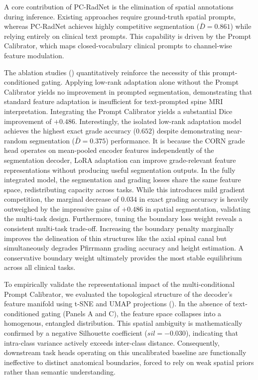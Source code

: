 \documentclass[journal]{IEEEtran}
\newcommand{\modelname}{PC-RadNet}
\begin{document}
A core contribution of \modelname{} is the elimination of spatial annotations during inference. Existing approaches require ground-truth spatial prompts, whereas \modelname{} achieves highly competitive segmentation ($\bar{D}=0.861$) while relying entirely on clinical text prompts. This capability is driven by the Prompt Calibrator, which maps closed-vocabulary clinical prompts to channel-wise feature modulation.  

The ablation studies () quantitatively reinforce the necessity of this prompt-conditioned gating. Applying low-rank adaptation alone without the Prompt Calibrator yields no improvement in prompted segmentation, demonstrating that standard feature adaptation is insufficient for text-prompted spine MRI interpretation. Integrating the Prompt Calibrator yields a substantial Dice improvement of $+0.486$. Interestingly, the isolated low-rank adaptation model achieves the highest exact grade accuracy ($0.652$) despite demonstrating near-random segmentation ($\bar{D}=0.375$) performance. It is because the CORN grade head operates on mean-pooled encoder features independently of the segmentation decoder, LoRA adaptation can improve grade-relevant feature representations without producing useful segmentation outputs. In the fully integrated model, the segmentation and grading losses share the same feature space, redistributing capacity across tasks. While this introduces mild gradient competition, the marginal decrease of $0.034$ in exact grading accuracy is heavily outweighed by the impressive gains of $+0.486$ in spatial segmentation, validating the multi-task design. Furthermore, tuning the boundary loss weight reveals a consistent multi-task trade-off. Increasing the boundary penalty marginally improves the delineation of thin structures like the axial spinal canal but simultaneously degrades Pfirrmann grading accuracy and height estimation. A conservative boundary weight ultimately provides the most stable equilibrium across all clinical tasks.

To empirically validate the representational impact of the multi-conditional Prompt Calibrator, we evaluated the topological structure of the decoder's feature manifold using t-SNE \cite{vandermaaten2008tsne} and UMAP projections (). In the absence of text-conditioned gating (Panels A and C), the feature space collapses into a homogenous, entangled distribution. This spatial ambiguity is mathematically confirmed by a negative Silhouette coefficient ($sil = -0.030$), indicating that intra-class variance actively exceeds inter-class distance. Consequently, downstream task heads operating on this uncalibrated baseline are functionally ineffective to distinct anatomical boundaries, forced to rely on weak spatial priors rather than semantic understanding.
\end{document}
